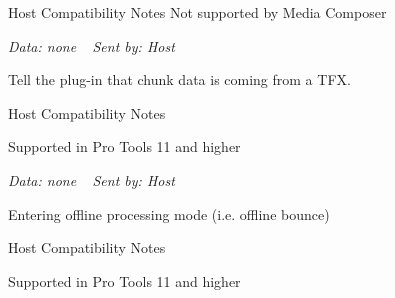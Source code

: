 \begin{Desc}
\begin{description}
\begin{DoxyRefDesc}{Host Compatibility Notes}
Not supported by Media Composer\end{DoxyRefDesc}


{\itshape Data\+: none} ~\newline
 {\itshape Sent by\+: Host} \item[{\em 
\hypertarget{a00206_afab5ea2cfd731fc8f163b6caa685406eae80fd29dd36171bc1eb02b30e30825da}{}A\+A\+X\+\_\+e\+Notification\+Event\+\_\+\+Preset\+Opened\label{a00206_afab5ea2cfd731fc8f163b6caa685406eae80fd29dd36171bc1eb02b30e30825da}
}]Tell the plug-\/in that chunk data is coming from a T\+F\+X. \begin{DoxyRefDesc}{Host Compatibility Notes}
\item[\hyperlink{a00380__compatibility_notes000034}{Host Compatibility Notes}]Supported in Pro Tools 11 and higher\end{DoxyRefDesc}


{\itshape Data\+: none} ~\newline
 {\itshape Sent by\+: Host} \item[{\em 
\hypertarget{a00206_afab5ea2cfd731fc8f163b6caa685406eacb91c4b0d87f576d27da721ebce4bf37}{}A\+A\+X\+\_\+e\+Notification\+Event\+\_\+\+Entering\+Offline\+Mode\label{a00206_afab5ea2cfd731fc8f163b6caa685406eacb91c4b0d87f576d27da721ebce4bf37}
}]Entering offline processing mode (i.\+e. offline bounce) \begin{DoxyRefDesc}{Host Compatibility Notes}
\item[\hyperlink{a00380__compatibility_notes000035}{Host Compatibility Notes}]Supported in Pro Tools 11 and higher\end{DoxyRefDesc}



\end{description}
\end{Desc}

